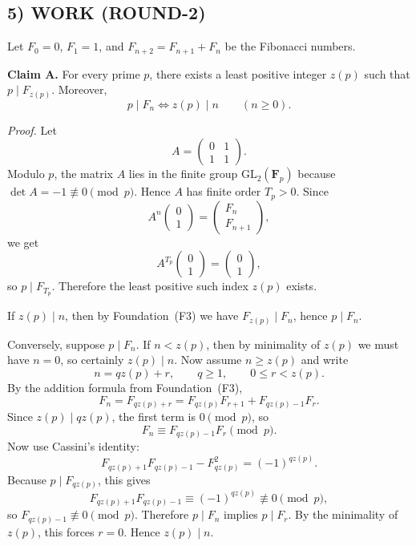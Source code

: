 \subsection*{5) WORK (ROUND-2)}

Let $F_0=0$, $F_1=1$, and $F_{n+2}=F_{n+1}+F_n$ be the Fibonacci numbers.

\medskip
\noindent\textbf{Claim A.} For every prime $p$, there exists a least positive integer $z(p)$ such that $p\mid F_{z(p)}$. Moreover,
\[
p\mid F_n \iff z(p)\mid n \qquad (n\ge 0).
\]

\medskip
\noindent\emph{Proof.}
Let
\[
A=\left(\begin{array}{cc}0&1\\ 1&1\end{array}\right).
\]
Modulo $p$, the matrix $A$ lies in the finite group $\mathrm{GL}_2(\mathbf{F}_p)$ because $\det A=-1\not\equiv 0\pmod p$. Hence $A$ has finite order $T_p>0$. Since
\[
A^n\left(\begin{array}{c}0\\ 1\end{array}\right)=
\left(\begin{array}{c}F_n\\ F_{n+1}\end{array}\right),
\]
we get
\[
A^{T_p}\left(\begin{array}{c}0\\ 1\end{array}\right)=
\left(\begin{array}{c}0\\ 1\end{array}\right),
\]
so $p\mid F_{T_p}$. Therefore the least positive such index $z(p)$ exists.

If $z(p)\mid n$, then by Foundation~(F3) we have $F_{z(p)}\mid F_n$, hence $p\mid F_n$.

Conversely, suppose $p\mid F_n$. If $n<z(p)$, then by minimality of $z(p)$ we must have $n=0$, so certainly $z(p)\mid n$. Now assume $n\ge z(p)$ and write
\[
n=qz(p)+r,\qquad q\ge 1,\qquad 0\le r<z(p).
\]
By the addition formula from Foundation~(F3),
\[
F_n=F_{qz(p)+r}=F_{qz(p)}F_{r+1}+F_{qz(p)-1}F_r.
\]
Since $z(p)\mid qz(p)$, the first term is $0\pmod p$, so
\[
F_n\equiv F_{qz(p)-1}F_r\pmod p.
\]
Now use Cassini's identity:
\[
F_{qz(p)+1}F_{qz(p)-1}-F_{qz(p)}^2=(-1)^{qz(p)}.
\]
Because $p\mid F_{qz(p)}$, this gives
\[
F_{qz(p)+1}F_{qz(p)-1}\equiv (-1)^{qz(p)}\not\equiv 0\pmod p,
\]
so $F_{qz(p)-1}\not\equiv 0\pmod p$. Therefore $p\mid F_n$ implies $p\mid F_r$. By the minimality of $z(p)$, this forces $r=0$. Hence $z(p)\mid n$.

